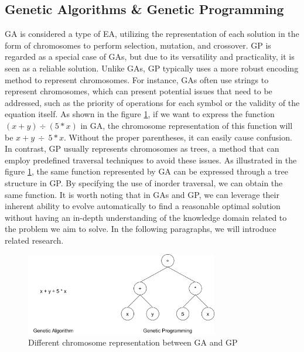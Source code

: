 \begin{ZhChapter}
    \subsection{Genetic Algorithms \& Genetic Programming}
    GA is considered a type of EA, utilizing the representation of each solution in the form of chromosomes to perform selection, mutation, and crossover. GP is regarded as a special case of GAs, but due to its versatility and practicality, it is seen as a reliable solution. Unlike GAs, GP typically uses a more robust encoding method to represent chromosomes. For instance, GAs often use strings to represent chromosomes, which can present potential issues that need to be addressed, such as the priority of operations for each symbol or the validity of the equation itself. As shown in the figure \ref{fig: GPandGA}, if we want to express the function $(x + y) ÷ (5 * x)$ in GA, the chromosome representation of this function will be $x + y\ ÷\ 5 * x$. Without the proper parentheses, it can easily cause confusion. In contrast, GP usually represents chromosomes as trees, a method that can employ predefined traversal techniques to avoid these issues. As illustrated in the figure \ref{fig: GPandGA}, the same function represented by GA can be expressed through a tree structure in GP. By specifying the use of inorder traversal, we can obtain the same function. It is worth noting that in GAs and GP, we can leverage their inherent ability to evolve automatically to find a reasonable optimal solution without having an in-depth understanding of the knowledge domain related to the problem we aim to solve. In the following paragraphs, we will introduce related research.

    \begin{figure}[htbp]
        \centering
        \includegraphics[width = 0.75\textwidth]{image/GPandGA.png}
        \caption{Different chromosome representation between GA and GP}
        \label{fig: GPandGA}
    \end{figure}


\end{ZhChapter}

